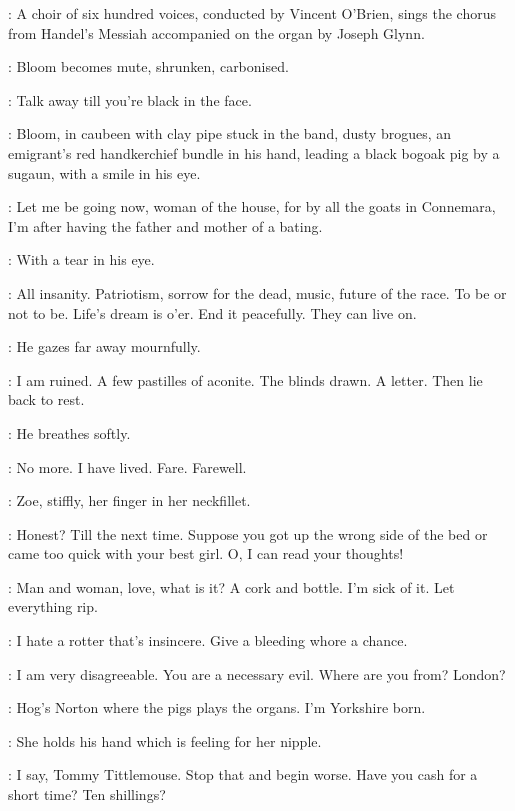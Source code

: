 :
A choir of six hundred voices,
conducted by Vincent O'Brien,
sings the chorus from Handel's Messiah
accompanied on the organ by Joseph Glynn.

:
Bloom becomes mute,
shrunken,
carbonised.

\par

\Zoe[2]:
Talk away till you're black in the face.

:
Bloom,
in caubeen with clay pipe stuck in the band,
dusty brogues,
an emigrant's red handkerchief bundle in his hand,
leading a black bogoak pig by a sugaun,
with a smile in his eye.

\Bloom:
Let me be going now,
woman of the house,
for by all the goats in Connemara,
I'm after having the father and mother of a bating.

:
With a tear in his eye.

\Bloom:
All insanity.
Patriotism,
sorrow for the dead,
music,
future of the race.
To be or not to be.
Life's dream is o'er.
End it peacefully.
They can live on.

:
He gazes far away mournfully.

\Bloom:
I am ruined.
A few pastilles of aconite.
The blinds drawn.
A letter.
Then lie back to rest.

:
He breathes softly.

\Bloom:
No more.
I have lived.
Fare.
Farewell.

:
Zoe,
stiffly,
her finger in her neckfillet.

\Zoe:
Honest?
Till the next time.
Suppose you got up the wrong side of the bed or came too quick with your best girl.
O,
I can read your thoughts!

\Bloom:
Man and woman,
love,
what is it?
A cork and bottle.
I'm sick of it.
Let everything rip.

\Zoe:
I hate a rotter that's insincere.
Give a bleeding whore a chance.

\Bloom:
I am very disagreeable.
You are a necessary evil.
Where are you from?
London?

\Zoe:
Hog's Norton where the pigs plays the organs.
I'm Yorkshire born.

:
She holds his hand which is feeling for her nipple.

\Zoe:
I say,
Tommy Tittlemouse.
Stop that and begin worse.
Have you cash for a short time?
Ten shillings?

